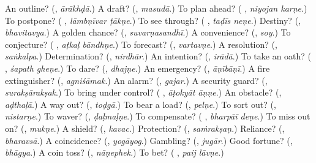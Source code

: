 \begin{tcolorbox}[breakable,colback=teal!4,colframe=teal!35!black,title={Before you move on}]
An outline? (\textbf{}, \emph{ārākhḍā}.) A draft? (\textbf{}, \emph{masudā}.) To plan ahead? (\textbf{ }, \emph{niyojan karṇe}.) To postpone? (\textbf{ }, \emph{lāmbṇīvar ṭākṇe}.) To see through? (\textbf{ }, \emph{taḍīs neṇe}.) Destiny? (\textbf{}, \emph{bhavitavya}.) A golden chance? (\textbf{}, \emph{suvarṇasandhī}.) A convenience? (\textbf{}, \emph{soy}.) To conjecture? (\textbf{ }, \emph{aṭkaḷ bāndhṇe}.) To forecast? (\textbf{}, \emph{vartavṇe}.) A resolution? (\textbf{}, \emph{saṅkalpa}.) Determination? (\textbf{}, \emph{nirdhār}.) An intention? (\textbf{}, \emph{irādā}.) To take an oath? (\textbf{ }, \emph{śapath gheṇe}.) To dare? (\textbf{}, \emph{dhajṇe}.) An emergency? (\textbf{}, \emph{āṇībāṇī}.) A fire extinguisher? (\textbf{}, \emph{agniśāmak}.) An alarm? (\textbf{}, \emph{gajar}.) A security guard? (\textbf{}, \emph{surakṣārakṣak}.) To bring under control? (\textbf{ }, \emph{āṭokyāt āṇṇe}.) An obstacle? (\textbf{}, \emph{aḍthaḷā}.) A way out? (\textbf{}, \emph{toḍgā}.) To bear a load? (\textbf{}, \emph{pelṇe}.) To sort out? (\textbf{}, \emph{nistarṇe}.) To waver? (\textbf{}, \emph{ḍaḷmaḷṇe}.) To compensate? (\textbf{ }, \emph{bharpāī deṇe}.) To miss out on? (\textbf{}, \emph{mukṇe}.) A shield? (\textbf{}, \emph{kavac}.) Protection? (\textbf{}, \emph{saṁrakṣaṇ}.) Reliance? (\textbf{}, \emph{bharavsā}.) A coincidence? (\textbf{}, \emph{yogāyog}.) Gambling? (\textbf{}, \emph{jugār}.) Good fortune? (\textbf{}, \emph{bhāgya}.) A coin toss? (\textbf{}, \emph{nāṇephek}.) To bet? (\textbf{ }, \emph{paij lāvṇe}.)
\end{tcolorbox}
